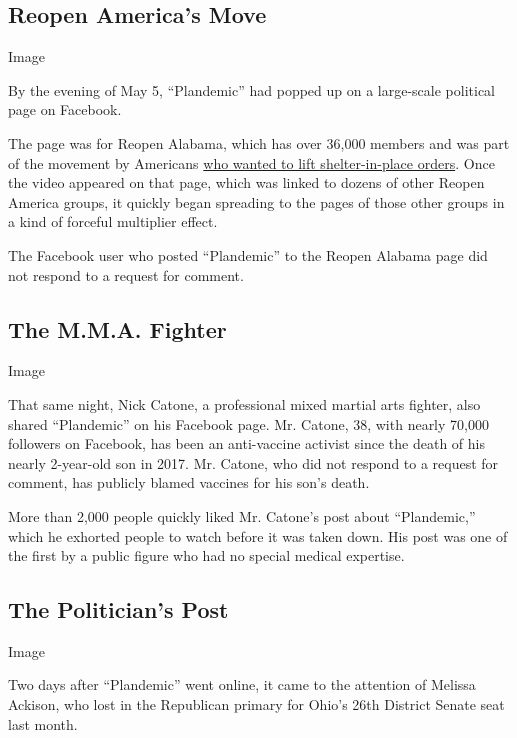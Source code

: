 \hypertarget{reopen-americas-move}{%
\subsection{Reopen America's Move}\label{reopen-americas-move}}

Image

By the evening of May 5, ``Plandemic'' had popped up on a large-scale
political page on Facebook.

The page was for Reopen Alabama, which has over 36,000 members and was
part of the movement by Americans
\href{https://www.nytimes.com/2020/04/21/us/politics/coronavirus-protests-trump.html}{who
wanted to lift shelter-in-place orders}. Once the video appeared on that
page, which was linked to dozens of other Reopen America groups, it
quickly began spreading to the pages of those other groups in a kind of
forceful multiplier effect.

The Facebook user who posted ``Plandemic'' to the Reopen Alabama page
did not respond to a request for comment.

\hypertarget{the-mma-fighter}{%
\subsection{The M.M.A. Fighter}\label{the-mma-fighter}}

Image

That same night, Nick Catone, a professional mixed martial arts fighter,
also shared ``Plandemic'' on his Facebook page. Mr. Catone, 38, with
nearly 70,000 followers on Facebook, has been an anti-vaccine activist
since the death of his nearly 2-year-old son in 2017. Mr. Catone, who
did not respond to a request for comment, has publicly blamed vaccines
for his son's death.

More than 2,000 people quickly liked Mr. Catone's post about
``Plandemic,'' which he exhorted people to watch before it was taken
down. His post was one of the first by a public figure who had no
special medical expertise.

\hypertarget{the-politicians-post}{%
\subsection{The Politician's Post}\label{the-politicians-post}}

Image

Two days after ``Plandemic'' went online, it came to the attention of
Melissa Ackison, who lost in the Republican primary for Ohio's 26th
District Senate seat last month.


